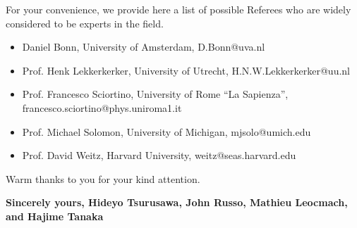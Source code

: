 \documentclass[11pt]{article}
\begin{document}
\vskip 0.3cm
For your convenience, we provide here a list of possible Referees who are widely considered to be experts in the field.
\begin{itemize}
\item Daniel Bonn, University of Amsterdam, D.Bonn@uva.nl
\item Prof. Henk Lekkerkerker, University of Utrecht, H.N.W.Lekkerkerker@uu.nl
\item Prof. Francesco Sciortino, University of Rome ``La Sapienza'', \\ francesco.sciortino@phys.uniroma1.it
\item Prof. Michael Solomon, University of Michigan, mjsolo@umich.edu
\item Prof. David Weitz, Harvard University, weitz­@seas.harvard.edu
\end{itemize}






\vskip 0.3cm
\noindent
Warm thanks to you for your kind attention.

\vskip 0.8cm

{\bf 
\noindent
Sincerely yours,
\vskip 0.3cm
\noindent
Hideyo Tsurusawa, John Russo, Mathieu Leocmach, \\ 
and Hajime Tanaka
}
\end{document}
